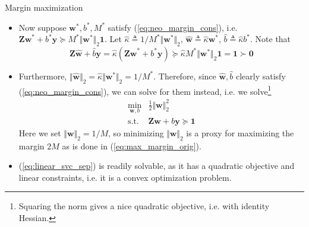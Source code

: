 \documentclass{beamer}
\numberwithin{equation}{section}
\newcommand{\aref}[1]{\alert{\ref{#1}}}
\begin{document}
\begin{frame}{Margin maximization}
    \begin{itemize}
        \item
        Now suppose $ \mathbf{w}^*, b^*, M^* $ satisfy
        (\aref{eq:neo_margin_cons}), i.e. $ \mathbf{Zw}^* + b^*\mathbf{y}
        \succeq M^*\Vert\mathbf{w}^*\Vert_2\mathbf{1} $. Let $ \hat{\kappa}
        \triangleq 1 / M^*\Vert\mathbf{w}^*\Vert_2 $, $ \hat{\mathbf{w}}
        \triangleq \hat{\kappa}\mathbf{w}^* $, $ \hat{b} \triangleq
        \hat{\kappa}b^* $. Note that
        \begin{equation*}
            \mathbf{Z}\hat{\mathbf{w}} + \hat{b}\mathbf{y} =
            \hat{\kappa}(\mathbf{Zw}^* + b^*\mathbf{y}) \succeq
            \hat{\kappa}M^*\Vert\mathbf{w}^*\Vert_2\mathbf{1} = \mathbf{1}
            \succ \mathbf{0}
        \end{equation*}

        \item
        Furthermore, $ \Vert\hat{\mathbf{w}}\Vert_2 =
        \hat{\kappa}\Vert\mathbf{w}^*\Vert_2 = 1 / M^* $. Therefore, since
        $ \hat{\mathbf{w}}, \hat{b} $ clearly satisfy
        (\aref{eq:neo_margin_cons}), we can solve for them instead, i.e. we
        solve\footnote{
            Squaring the norm gives a nice quadratic objective, i.e. with
            identity Hessian.
        }
        \begin{equation} \label{eq:linear_svc_sep}
            \begin{array}{ll}
                \displaystyle\min_{\mathbf{w}, b} &
                \frac{1}{2}\Vert\mathbf{w}\Vert_2^2 \\
                \text{s.t.} & \mathbf{Zw} + b\mathbf{y} \succeq \mathbf{1}
            \end{array}
        \end{equation}
        Here we set $ \Vert\mathbf{w}\Vert_2 = 1 / M $, so minimizing
        $ \Vert\mathbf{w}\Vert_2 $ is a proxy for maximizing the margin $ 2M $
        as is done in (\aref{eq:max_margin_orig}).

        \item
        (\aref{eq:linear_svc_sep}) is readily solvable, as it has a quadratic
        objective and linear constraints, i.e. it is a \alert{convex}
        optimization problem.
    \end{itemize}

    \medskip
\end{frame}
\end{document}
